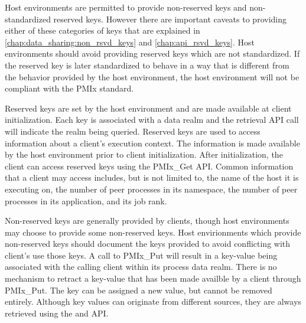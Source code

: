 Host environments are permitted to provide non-reserved keys and non-standardized reserved keys.  
However there are important caveats to providing either of these categories of keys 
that are explained in \ref{chap:data_sharing:non_rsvd_keys} and \ref{chap:api_rsvd_keys}.
Host environments should avoid providing reserved keys which are not standardized.  
If the reserved key is later standardized to behave in a way that is different from the behavior 
provided by the host environment, the host environment will not be compliant with the PMIx standard.
 
Reserved keys are set by the host environment and are made available at client initialization. 
Each key is associated with a data realm and the retrieval API call will indicate the realm being queried.
Reserved keys are used to access information about a client's execution context.
The information is made available by the host environment prior to client initialization.
After initialization, the client can access reserved keys using the PMIx_Get API.  
Common information that a client may access includes, but is not limited to,
the name of the host it is executing on, 
the number of peer processes in its namespace,
the number of peer processes in its application,
and its job rank.


Non-reserved keys are generally provided by clients, though host environments may choose to 
provide some non-reserved keys.  Host envirionments which provide non-reserved keys should document 
the keys provided to avoid conflicting with client's use those keys.
A call to PMIx_Put will result in a key-value being associated with the calling client within 
its process data realm.
There is no mechanism to retract a key-value that has been made availble by a client through PMIx_Put.
The key can be assigned a new value, but cannot be removed entirely.
Although key values can originate from different sources, they are always retrieved using the
 and  API.

